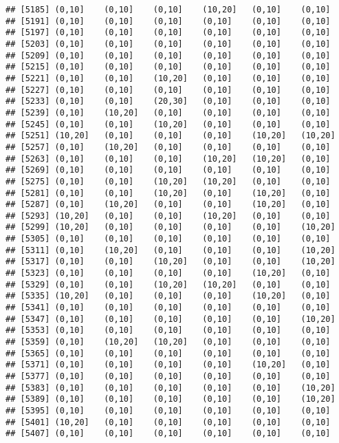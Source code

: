 \documentclass[]{article}
\begin{document}
\begin{verbatim}
## [5185] (0,10]    (0,10]    (0,10]    (10,20]   (0,10]    (0,10]   
## [5191] (0,10]    (0,10]    (0,10]    (0,10]    (0,10]    (0,10]   
## [5197] (0,10]    (0,10]    (0,10]    (0,10]    (0,10]    (0,10]   
## [5203] (0,10]    (0,10]    (0,10]    (0,10]    (0,10]    (0,10]   
## [5209] (0,10]    (0,10]    (0,10]    (0,10]    (0,10]    (0,10]   
## [5215] (0,10]    (0,10]    (0,10]    (0,10]    (0,10]    (0,10]   
## [5221] (0,10]    (0,10]    (10,20]   (0,10]    (0,10]    (0,10]   
## [5227] (0,10]    (0,10]    (0,10]    (0,10]    (0,10]    (0,10]   
## [5233] (0,10]    (0,10]    (20,30]   (0,10]    (0,10]    (0,10]   
## [5239] (0,10]    (10,20]   (0,10]    (0,10]    (0,10]    (0,10]   
## [5245] (0,10]    (0,10]    (10,20]   (0,10]    (0,10]    (0,10]   
## [5251] (10,20]   (0,10]    (0,10]    (0,10]    (10,20]   (10,20]  
## [5257] (0,10]    (10,20]   (0,10]    (0,10]    (0,10]    (0,10]   
## [5263] (0,10]    (0,10]    (0,10]    (10,20]   (10,20]   (0,10]   
## [5269] (0,10]    (0,10]    (0,10]    (0,10]    (0,10]    (0,10]   
## [5275] (0,10]    (0,10]    (10,20]   (10,20]   (0,10]    (0,10]   
## [5281] (0,10]    (0,10]    (10,20]   (0,10]    (10,20]   (0,10]   
## [5287] (0,10]    (10,20]   (0,10]    (0,10]    (10,20]   (0,10]   
## [5293] (10,20]   (0,10]    (0,10]    (10,20]   (0,10]    (0,10]   
## [5299] (10,20]   (0,10]    (0,10]    (0,10]    (0,10]    (10,20]  
## [5305] (0,10]    (0,10]    (0,10]    (0,10]    (0,10]    (0,10]   
## [5311] (0,10]    (10,20]   (0,10]    (0,10]    (0,10]    (10,20]  
## [5317] (0,10]    (0,10]    (10,20]   (0,10]    (0,10]    (10,20]  
## [5323] (0,10]    (0,10]    (0,10]    (0,10]    (10,20]   (0,10]   
## [5329] (0,10]    (0,10]    (10,20]   (10,20]   (0,10]    (0,10]   
## [5335] (10,20]   (0,10]    (0,10]    (0,10]    (10,20]   (0,10]   
## [5341] (0,10]    (0,10]    (0,10]    (0,10]    (0,10]    (0,10]   
## [5347] (0,10]    (0,10]    (0,10]    (0,10]    (0,10]    (10,20]  
## [5353] (0,10]    (0,10]    (0,10]    (0,10]    (0,10]    (0,10]   
## [5359] (0,10]    (10,20]   (10,20]   (0,10]    (0,10]    (0,10]   
## [5365] (0,10]    (0,10]    (0,10]    (0,10]    (0,10]    (0,10]   
## [5371] (0,10]    (0,10]    (0,10]    (0,10]    (10,20]   (0,10]   
## [5377] (0,10]    (0,10]    (0,10]    (0,10]    (0,10]    (0,10]   
## [5383] (0,10]    (0,10]    (0,10]    (0,10]    (0,10]    (10,20]  
## [5389] (0,10]    (0,10]    (0,10]    (0,10]    (0,10]    (10,20]  
## [5395] (0,10]    (0,10]    (0,10]    (0,10]    (0,10]    (0,10]   
## [5401] (10,20]   (0,10]    (0,10]    (0,10]    (0,10]    (0,10]   
## [5407] (0,10]    (0,10]    (0,10]    (0,10]    (0,10]    (0,10]   

\end{verbatim}
\end{document}
